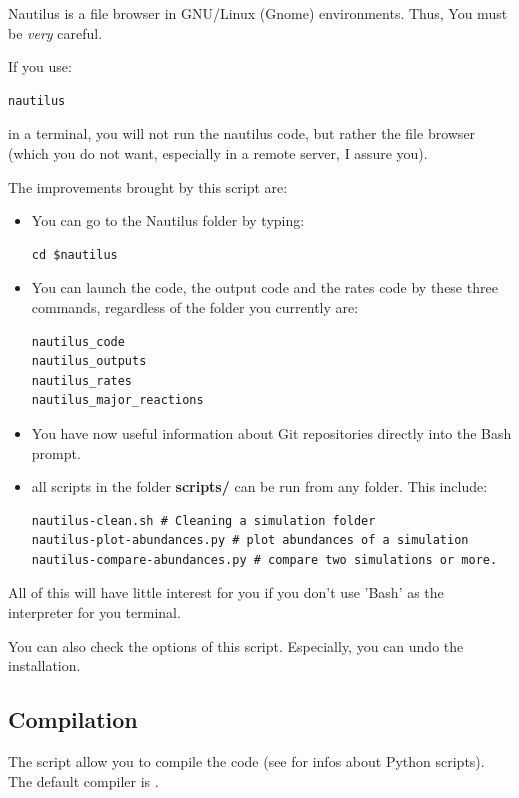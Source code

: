 \documentclass[english,a4paper,twoside]{article}
\begin{document}
\begin{attention}
Nautilus is a file browser in GNU/Linux (Gnome) environments. Thus, You must be \emph{very} careful. 

If you use:
\begin{verbatim}
nautilus
\end{verbatim}
in a terminal, you will not run the nautilus code, but rather the file browser (which you do not want, especially in a remote server, I assure you). 
\end{attention}

The improvements brought by this script are:
\begin{itemize}
\item You can go to the Nautilus folder by typing:
\begin{verbatim}
cd $nautilus
\end{verbatim}
\item You can launch the code, the output code and the rates code by these three commands, regardless of the folder you currently are:
\begin{verbatim}
nautilus_code
nautilus_outputs
nautilus_rates
nautilus_major_reactions
\end{verbatim}
\item You have now useful information about Git repositories directly into the Bash prompt.
\item all scripts in the folder \textbf{scripts/} can be run from any folder. This include:
\begin{verbatim}
nautilus-clean.sh # Cleaning a simulation folder
nautilus-plot-abundances.py # plot abundances of a simulation
nautilus-compare-abundances.py # compare two simulations or more.
\end{verbatim}
\end{itemize}

\begin{remarque}
All of this will have little interest for you if you don't use 'Bash' as the interpreter for you terminal.

You can also check the options of this script. Especially, you can undo the installation.
\end{remarque}

\subsection{Compilation}
The script  allow you to compile the code (see  for infos about Python scripts). The default compiler is . 
\end{document}
